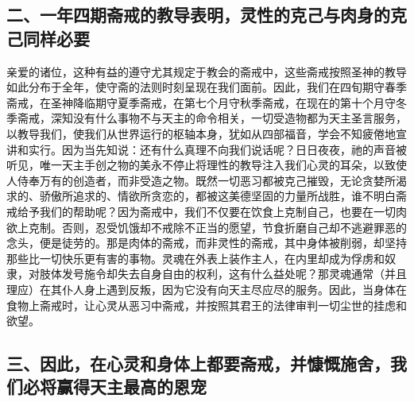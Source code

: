 
\subsection{二、一年四期斋戒的教导表明，灵性的克己与肉身的克己同样必要}

亲爱的诸位，这种有益的遵守尤其规定于教会的斋戒中，这些斋戒按照圣神的教导如此分布于全年，使守斋的法则时刻呈现在我们面前。因此，我们在四旬期守春季斋戒，在圣神降临期守夏季斋戒，在第七个月守秋季斋戒，在现在的第十个月守冬季斋戒，深知没有什么事物不与天主的命令相关，一切受造物都为天主圣言服务，以教导我们，使我们从世界运行的枢轴本身，犹如从四部福音，学会不知疲倦地宣讲和实行。因为当先知说：还有什么真理不向我们说话呢？日日夜夜，祂的声音被听见，唯一天主手创之物的美永不停止将理性的教导注入我们心灵的耳朵，以致使人侍奉万有的创造者，而非受造之物。既然一切恶习都被克己摧毁，无论贪婪所渴求的、骄傲所追求的、情欲所贪恋的，都被这美德坚固的力量所战胜，谁不明白斋戒给予我们的帮助呢？因为斋戒中，我们不仅要在饮食上克制自己，也要在一切肉欲上克制。否则，忍受饥饿却不戒除不正当的愿望，节食折磨自己却不逃避罪恶的念头，便是徒劳的。那是肉体的斋戒，而非灵性的斋戒，其中身体被削弱，却坚持那些比一切快乐更有害的事物。灵魂在外表上装作主人，在内里却成为俘虏和奴隶，对肢体发号施令却失去自身自由的权利，这有什么益处呢？那灵魂通常（并且理应）在其仆人身上遇到反叛，因为它没有向天主尽应尽的服务。因此，当身体在食物上斋戒时，让心灵从恶习中斋戒，并按照其君王的法律审判一切尘世的挂虑和欲望。\par


\subsection{三、因此，在心灵和身体上都要斋戒，并慷慨施舍，我们必将赢得天主最高的恩宠}

